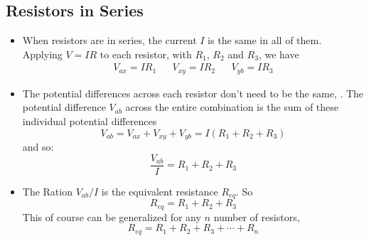 \documentclass[11pt, a4paper]{article}
\begin{document}
\subsection{Resistors in Series}
\begin{itemize}
    \item When resistors are in series, the current $I$ is the same in all of them.
        Applying $V = IR$ to each resistor, with $R_1$, $R_{2}$ and $R_{3}$, we have
        \begin{align}
            V_{ax} = IR_{1} && V_{xy} = IR_{2} && V_{yb} = IR_{3}
        \end{align}
    \item The potential differences across each resistor don't need to be the same, . The
        potential difference $V_{ab}$ across the entire combination is the sum of these
        individual potential differences
        \begin{equation}
            V_{ab} = V_{ax} + V_{xy} + V_{yb} = I(R_{1} + R_{2} + R_{3})
        \end{equation}
        and so:
        \begin{equation}
            \frac{V_{ab}}{I} = R_{1} + R_{2} + R_{3}
        \end{equation}
    \item The Ration $V_{ab} / I$ is the equivalent resistance $R_{eq}$. So
        \begin{equation}
            R_{eq} = R_{1} + R_{2} + R_{3}
        \end{equation}
        This of course can be generalized for any $n$ number of resistors,
        \begin{equation}
            R_{eq} = R_{1} + R_{2} + R_{3} + \cdots + R_{n}
        \end{equation}
\end{itemize}
\end{document}
